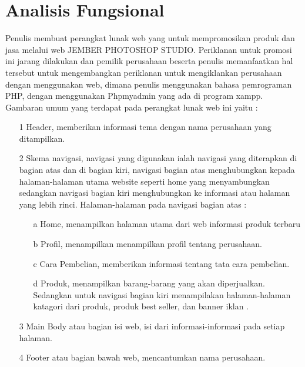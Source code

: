 \documentclass{jtetiproposalskripsi}
\begin{document}
\section{Analisis Fungsional }
Penulis membuat perangkat lunak web  yang untuk mempromosikan produk dan jasa melalui web JEMBER PHOTOSHOP STUDIO. Periklanan untuk promosi ini jarang dilakukan dan pemilik perusahaan beserta penulis memanfaatkan hal tersebut untuk mengembangkan periklanan untuk mengiklankan perusahaan dengan menggunakan web, dimana penulis menggunakan bahasa pemrograman PHP, dengan menggunakan Phpmyadmin yang ada di program xampp. Gambaran umum yang terdapat pada perangkat lunak web ini yaitu : 
\begin{itemize}
\item[1]Header,  memberikan  informasi  tema  dengan  nama  perusahaan  yang ditampilkan.

\item[2]Skema navigasi, navigasi  yang digunakan ialah  navigasi  yang diterapkan di bagian atas dan di bagian kiri, navigasi bagian atas menghubungkan kepada halaman-halaman utama website seperti home yang  menyambungkan sedangkan  navigasi  bagian  kiri  menghubungkan  ke  informasi  atau halaman yang lebih rinci. Halaman-halaman pada navigasi bagian atas : 
\begin{itemize}
\item[a]Home, menampilkan halaman utama dari web informasi produk terbaru
\item[b]Profil, menampilkan menampilkan profil tentang perusahaan.
\item[c]Cara Pembelian, memberikan informasi tentang tata cara pembelian.
\item[d]Produk, menampilkan barang-barang yang akan diperjualkan. Sedangkan untuk  navigasi  bagian  kiri  menampilakan  halaman-halaman katagori dari produk, produk best seller, dan banner iklan . 
\end{itemize}
\item[3]Main Body atau bagian isi web, isi dari informasi-informasi pada setiap halaman.
\item[4]Footer atau bagian bawah web, mencantumkan nama perusahaan.
\end{itemize}
\end{document}
